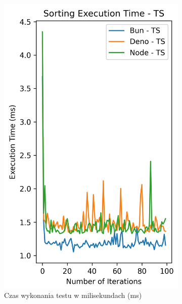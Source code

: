 \begin{figure}[H]
  \centering
  \begin{subfigure}[b]{0.44\textwidth}
    \centering
    \includegraphics[width=\textwidth]{Figures/sorting/sorting_bubble_100_1000_ts_time.png}
    \caption{Czas wykonania testu w milisekundach (ms)}
    \label{fig:bubble_sorting_e1_ts_time}
  \end{subfigure}
  \begin{subfigure}[b]{0.44\textwidth}
    \centering

\end{subfigure}
\end{figure}
